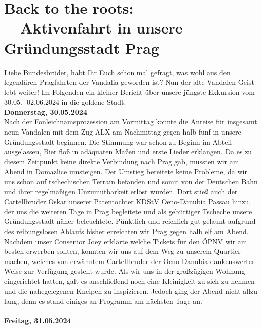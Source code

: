 \section{Back to the roots: \\ ~~Aktivenfahrt in unsere Gründungsstadt Prag}

\begin{multicols}{2}
Liebe Bundesbrüder,
habt Ihr Euch schon mal gefragt, was wohl aus den legendären Pragfahrten der Vandalia geworden ist? Nun der alte Vandalen-Geist lebt weiter! Im Folgenden ein kleiner Bericht über unsere jüngste Exkursion vom 30.05.- 02.06.2024 in die goldene Stadt.\\

\textbf{Donnerstag, 30.05.2024}\\
Nach der Fonleichnamsprozession am Vormittag konnte die Anreise für insgesamt neun Vandalen mit dem Zug ALX am Nachmittag gegen halb fünf in unsere Gründungsstadt beginnen. Die Stimmung war schon zu Beginn im Abteil ausgelassen, Bier floß in adäquaten Maßen und erste Lieder erklangen. Da es zu diesem Zeitpunkt keine direkte Verbindung nach Prag gab, mussten wir am Abend in Domazlice umsteigen. Der Umstieg bereitete keine Probleme, da wir uns schon auf tschechischen Terrain befanden und somit von der Deutschen Bahn und ihrer regelmäßigen Unzumutbarkeit erlöst wurden. Dort stieß auch der Cartellbruder Oskar unserer Patentochter KDStV Oeno-Danubia Passau hinzu, der uns die weiteren Tage in Prag begleitete und als gebürtiger Tscheche unsere Gründungsstadt näher beleuchtete. Pünktlich und reichlich gut gelaunt aufgrund des reibungslosen Ablaufs bisher erreichten wir Prag gegen halb elf am Abend. Nachdem unser Consenior Joey erklärte welche Tickets für den ÖPNV wir am besten erwerben sollten, konnten wir uns auf dem Weg zu unserem Quartier machen, welches von erwähntem Cartellbruder der Oeno-Danubia dankenswerter Weise zur Verfügung gestellt wurde. Als wir uns in der großzügigen Wohnung eingerichtet hatten, galt es anschließend noch eine Kleinigkeit zu sich zu nehmen und die nahegelegenen Kneipen zu inspizieren. Jedoch ging der Abend nicht allzu lang, denn es stand einiges an Programm am nächsten Tage an.\\
\\
\textbf{Freitag, 31.05.2024}\\

\end{multicols}
